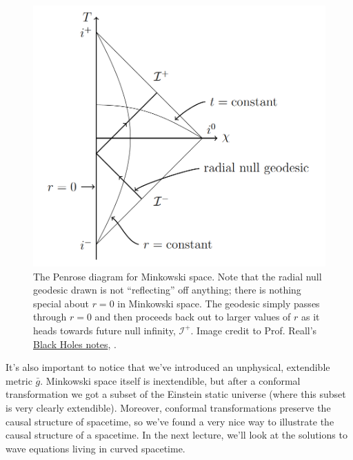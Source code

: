 \begin{figure}
    \centering
    \includegraphics{2019/02/20190222_reallminkowskipenrose}
    \caption{The Penrose diagram for Minkowski space. Note that the radial null geodesic drawn is not ``reflecting'' off anything; there is nothing special about $r=0$ in Minkowski space. The geodesic simply passes through $r=0$ and then proceeds back out to larger values of $r$ as it heads towards future null infinity, $\mathcal{I}^+$. Image credit to Prof. Reall's  \href{http://www.damtp.cam.ac.uk/user/hsr1000/black_holes_lectures_2016.pdf}{Black Holes notes}, .}
    \label{fig:reallminkowskipenrose}
\end{figure}

It's also important to notice that we've introduced an unphysical, extendible metric $\bar g$. Minkowski space itself is inextendible, but after a conformal transformation we got a subset of the Einstein static universe (where this subset is very clearly extendible). Moreover, conformal transformations preserve the causal structure of spacetime, so we've found a very nice way to illustrate the causal structure of a spacetime. In the next lecture, we'll look at the solutions to wave equations living in curved spacetime.